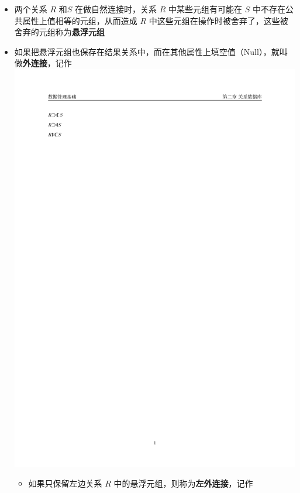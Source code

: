 \begin{itemize}
    \item 两个关系 $R$ 和$S$ 在做自然连接时，关系 $R$ 中某些元组有可能在 $S$ 中不存在公共属性上值相等的元组，从而造成 $R$ 中这些元组在操作时被舍弃了，这些被舍弃的元组称为\textbf{悬浮元组}
    \item 如果把悬浮元组也保存在结果关系中，而在其他属性上填空值（Null），就叫做\textbf{外连接}，记作 \includegraphics[scale=1]{images/full outer join.pdf}
    \begin{itemize}
        \item 如果只保留左边关系 $R$ 中的悬浮元组，则称为\textbf{左外连接}，记作

\end{itemize}
\end{itemize}
